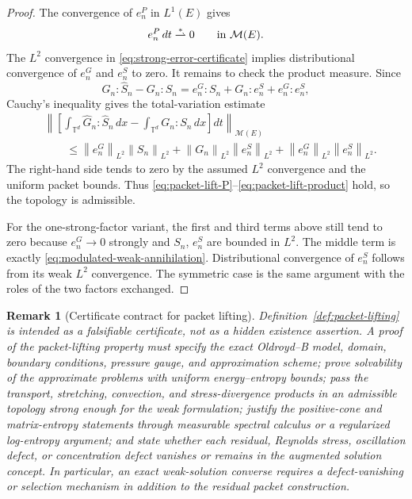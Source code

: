 \documentclass[11pt]{article}
\numberwithin{equation}{section}
\newtheorem{remark}[theorem]{Remark}
\newcommand{\T}{\mathbb T}
\newcommand{\norm}[1]{\left\lVert #1\right\rVert}
\begin{document}
\begin{proof}
The convergence of \(e^P_n\) in \(L^1(E)\) gives
\[
  e^P_n\,dt\stackrel{*}{\rightharpoonup}0
  \qquad\hbox{in }\mathcal M(E).
\]
The \(L^2\) convergence in \eqref{eq:strong-error-certificate} implies
distributional convergence of \(e^G_n\) and \(e^S_n\) to zero.  It remains to
check the product measure.  Since
\[
  \widehat G_n:\widehat S_n-G_n:S_n
  =
  e^G_n:S_n+G_n:e^S_n+e^G_n:e^S_n,
\]
Cauchy's inequality gives the total-variation estimate
\[
\begin{aligned}
  &\left\|
  \left[
  \int_{\T^d}\widehat G_n:\widehat S_n\,dx
  -\int_{\T^d}G_n:S_n\,dx
  \right]dt
  \right\|_{\mathcal M(E)}
\\
  &\qquad\le
  \norm{e^G_n}_{L^2}\norm{S_n}_{L^2}
  +\norm{G_n}_{L^2}\norm{e^S_n}_{L^2}
  +\norm{e^G_n}_{L^2}\norm{e^S_n}_{L^2}.
\end{aligned}
\]
The right-hand side tends to zero by the assumed \(L^2\) convergence and the
uniform packet bounds.  Thus \eqref{eq:packet-lift-P}--\eqref{eq:packet-lift-product}
hold, so the topology is admissible.

For the one-strong-factor variant, the first and third terms above still tend
to zero because \(e^G_n\to0\) strongly and \(S_n\), \(e^S_n\) are bounded in
\(L^2\).  The middle term is exactly
\eqref{eq:modulated-weak-annihilation}.  Distributional convergence of
\(e^S_n\) follows from its weak \(L^2\) convergence.  The symmetric case is the
same argument with the roles of the two factors exchanged.
\end{proof}

\begin{remark}[Certificate contract for packet lifting]
\label{rem:lifting-certificate-contract}
Definition~\ref{def:packet-lifting} is intended as a falsifiable certificate,
not as a hidden existence assertion.  A proof of the packet-lifting property
must specify the exact Oldroyd--B model, domain, boundary conditions, pressure
gauge, and approximation scheme; prove solvability of the approximate problems
with uniform energy--entropy bounds; pass the transport, stretching,
convection, and stress-divergence products in an admissible topology strong
enough for the weak formulation; justify the positive-cone and matrix-entropy
statements through measurable spectral calculus or a regularized log-entropy
argument; and state whether each residual, Reynolds stress, oscillation defect, or
concentration defect vanishes or remains in the augmented solution concept.  In
particular, an exact weak-solution converse requires a defect-vanishing or
selection mechanism in addition to the residual packet construction.
\end{remark}
\end{document}

